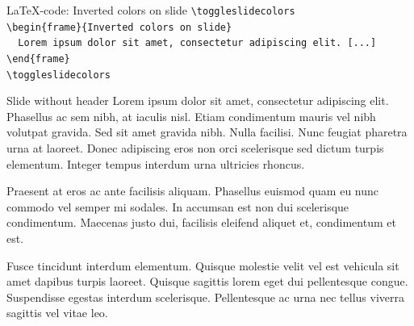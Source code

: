 \documentclass[t,11pt]{beamer}
\begin{document}
\toggleslidecolors
\begin{frame}[fragile]{\LaTeX-code: Inverted colors on slide}
\footnotesize
\verb|\toggleslidecolors|\\
\verb|\begin{frame}{Inverted colors on slide}|\\
\verb|  Lorem ipsum dolor sit amet, consectetur adipiscing elit. [...]|\\
\verb|\end{frame}|\\
\verb|\toggleslidecolors|\\
\end{frame}
\toggleslidecolors

{
\begin{frame}[plain]{Slide without header}
Lorem ipsum dolor sit amet, consectetur adipiscing elit. Phasellus ac sem nibh, at iaculis nisl. Etiam condimentum mauris vel nibh volutpat gravida. Sed sit amet gravida nibh. Nulla facilisi. Nunc feugiat pharetra urna at laoreet. Donec adipiscing eros non orci scelerisque sed dictum turpis elementum. Integer tempus interdum urna ultricies rhoncus.
\vspace{\baselineskip}

Praesent at eros ac ante facilisis aliquam. Phasellus euismod quam eu nunc commodo vel semper mi sodales. In accumsan est non dui scelerisque condimentum. Maecenas justo dui, facilisis eleifend aliquet et, condimentum et est.
\vspace{\baselineskip}

Fusce tincidunt interdum elementum. Quisque molestie velit vel est vehicula sit amet dapibus turpis laoreet. Quisque sagittis lorem eget dui pellentesque congue. Suspendisse egestas interdum scelerisque. Pellentesque ac urna nec tellus viverra sagittis vel vitae leo.
\end{frame}
}
\end{document}
